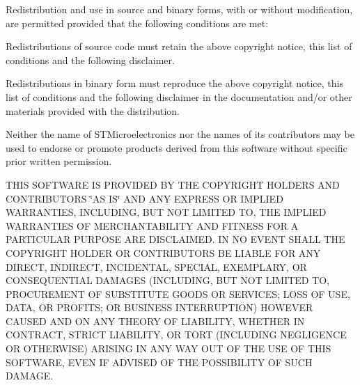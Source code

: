 Redistribution and use in source and binary forms, with or without modification, are permitted provided that the following conditions are met\+:
\begin{DoxyEnumerate}
\item Redistributions of source code must retain the above copyright notice, this list of conditions and the following disclaimer.
\item Redistributions in binary form must reproduce the above copyright notice, this list of conditions and the following disclaimer in the documentation and/or other materials provided with the distribution.
\item Neither the name of S\+T\+Microelectronics nor the names of its contributors may be used to endorse or promote products derived from this software without specific prior written permission.
\end{DoxyEnumerate}

T\+H\+IS S\+O\+F\+T\+W\+A\+RE IS P\+R\+O\+V\+I\+D\+ED BY T\+HE C\+O\+P\+Y\+R\+I\+G\+HT H\+O\+L\+D\+E\+RS A\+ND C\+O\+N\+T\+R\+I\+B\+U\+T\+O\+RS \char`\"{}\+A\+S I\+S\char`\"{} A\+ND A\+NY E\+X\+P\+R\+E\+SS OR I\+M\+P\+L\+I\+ED W\+A\+R\+R\+A\+N\+T\+I\+ES, I\+N\+C\+L\+U\+D\+I\+NG, B\+UT N\+OT L\+I\+M\+I\+T\+ED TO, T\+HE I\+M\+P\+L\+I\+ED W\+A\+R\+R\+A\+N\+T\+I\+ES OF M\+E\+R\+C\+H\+A\+N\+T\+A\+B\+I\+L\+I\+TY A\+ND F\+I\+T\+N\+E\+SS F\+OR A P\+A\+R\+T\+I\+C\+U\+L\+AR P\+U\+R\+P\+O\+SE A\+RE D\+I\+S\+C\+L\+A\+I\+M\+ED. IN NO E\+V\+E\+NT S\+H\+A\+LL T\+HE C\+O\+P\+Y\+R\+I\+G\+HT H\+O\+L\+D\+ER OR C\+O\+N\+T\+R\+I\+B\+U\+T\+O\+RS BE L\+I\+A\+B\+LE F\+OR A\+NY D\+I\+R\+E\+CT, I\+N\+D\+I\+R\+E\+CT, I\+N\+C\+I\+D\+E\+N\+T\+AL, S\+P\+E\+C\+I\+AL, E\+X\+E\+M\+P\+L\+A\+RY, OR C\+O\+N\+S\+E\+Q\+U\+E\+N\+T\+I\+AL D\+A\+M\+A\+G\+ES (I\+N\+C\+L\+U\+D\+I\+NG, B\+UT N\+OT L\+I\+M\+I\+T\+ED TO, P\+R\+O\+C\+U\+R\+E\+M\+E\+NT OF S\+U\+B\+S\+T\+I\+T\+U\+TE G\+O\+O\+DS OR S\+E\+R\+V\+I\+C\+ES; L\+O\+SS OF U\+SE, D\+A\+TA, OR P\+R\+O\+F\+I\+TS; OR B\+U\+S\+I\+N\+E\+SS I\+N\+T\+E\+R\+R\+U\+P\+T\+I\+ON) H\+O\+W\+E\+V\+ER C\+A\+U\+S\+ED A\+ND ON A\+NY T\+H\+E\+O\+RY OF L\+I\+A\+B\+I\+L\+I\+TY, W\+H\+E\+T\+H\+ER IN C\+O\+N\+T\+R\+A\+CT, S\+T\+R\+I\+CT L\+I\+A\+B\+I\+L\+I\+TY, OR T\+O\+RT (I\+N\+C\+L\+U\+D\+I\+NG N\+E\+G\+L\+I\+G\+E\+N\+CE OR O\+T\+H\+E\+R\+W\+I\+SE) A\+R\+I\+S\+I\+NG IN A\+NY W\+AY O\+UT OF T\+HE U\+SE OF T\+H\+IS S\+O\+F\+T\+W\+A\+RE, E\+V\+EN IF A\+D\+V\+I\+S\+ED OF T\+HE P\+O\+S\+S\+I\+B\+I\+L\+I\+TY OF S\+U\+CH D\+A\+M\+A\+GE. 